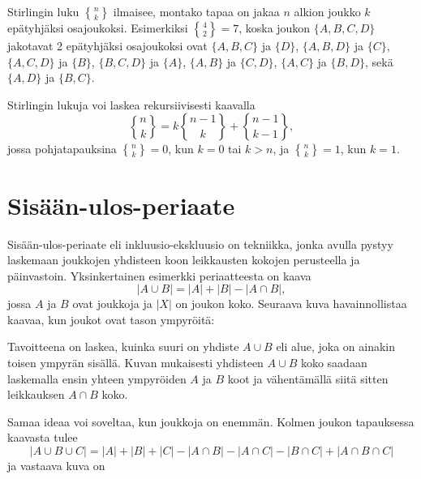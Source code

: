 Stirlingin luku ${n \brace k}$ ilmaisee,
montako tapaa on jakaa $n$ alkion joukko
$k$ epätyhjäksi osajoukoksi.
Esimerkiksi ${4 \brace 2}=7$, koska
joukon $\{A,B,C,D\}$ jakotavat 2
epätyhjäksi osajoukoksi ovat
 $\{A,B,C\}$ ja $\{D\}$, 
 $\{A,B,D\}$ ja $\{C\}$,
 $\{A,C,D\}$ ja $\{B\}$,
 $\{B,C,D\}$ ja $\{A\}$,
  $\{A,B\}$ ja $\{C,D\}$,
  $\{A,C\}$ ja $\{B,D\}$, sekä
  $\{A,D\}$ ja $\{B,C\}$.

\noindent
Stirlingin lukuja voi laskea rekursiivisesti kaavalla
\[ {n \brace k} = k{n-1 \brace k} + {n-1 \brace k-1}, \]
jossa pohjatapauksina ${n \brace k}=0$,
kun $k=0$ tai $k>n$, ja ${n \brace k}=1$, kun $k=1$.

\section{Sisään-ulos-periaate}

Sisään-ulos-periaate eli inkluusio-ekskluusio
on tekniikka, jonka avulla pystyy laskemaan
joukkojen yhdisteen koon leikkausten
kokojen perusteella ja päinvastoin.
Yksinkertainen esimerkki periaatteesta on kaava
\[ |A \cup B| = |A| + |B| - |A \cap B|,\]
jossa $A$ ja $B$ ovat joukkoja ja $|X|$ on joukon koko.
Seuraava kuva havainnollistaa kaavaa,
kun joukot ovat tason ympyröitä:

\begin{center}
\end{center}

Tavoitteena on laskea, kuinka suuri on yhdiste $A \cup B$
eli alue, joka on ainakin toisen ympyrän sisällä.
Kuvan mukaisesti yhdisteen $A \cup B$ koko
saadaan laskemalla ensin yhteen ympyröiden $A$ ja $B$ koot
ja vähentämällä siitä sitten leikkauksen $A \cap B$ koko.

Samaa ideaa voi soveltaa, kun joukkoja on enemmän.
Kolmen joukon tapauksessa kaavasta tulee
\[ |A \cup B \cup C| = |A| + |B| + |C| - |A \cap B|  - |A \cap C|  - |B \cap C| + |A \cap B \cap C| \]
ja vastaava kuva on


\begin{center}
\end{center}

